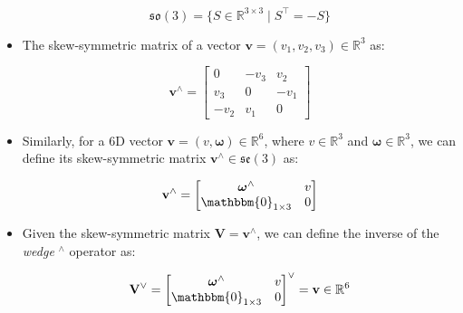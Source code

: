 \begin{itemize}
          \begin{equation}
              \mathfrak{so}(3) = \{S \in \mathbb{R}^{3\times3} \mid S^\top = -S \}
          \end{equation}

    \item The skew-symmetric matrix of a vector $\mathbf{v} = (v_1, v_2, v_3) \in \mathbb{R}^3$ as:

          \begin{equation}
              \mathbf{v} ^\wedge = \begin{bmatrix}
                  0    & -v_3 & v_2  \\
                  v_3  & 0    & -v_1 \\
                  -v_2 & v_1  & 0
              \end{bmatrix}
          \end{equation}

    \item Similarly, for a $6$D vector $\mathbf{v} = (v, \boldsymbol{\omega}) \in \mathbb{R}^6$, where $v \in \mathbb{R}^3$ and $\boldsymbol{\omega} \in \mathbb{R}^3$, we can define its skew-symmetric matrix $\mathbf{v} ^\wedge \in \mathfrak{se}(3)$ as:

          \begin{equation}
              \mathbf{v} ^\wedge = \begin{bmatrix}
                  \boldsymbol{\omega} ^\wedge            & v \\
                  \mathbbm{0} _{1 \times 3} & 0
              \end{bmatrix}
          \end{equation}

    \item Given the skew-symmetric matrix $\mathbf{V} = \mathbf{v}^\wedge$, we can define the inverse of the \textit{wedge} $^\wedge$ operator as:

          \begin{equation}
              \mathbf{V} ^\vee =
              \begin{bmatrix}
                  \boldsymbol{\omega} ^\wedge            & v \\
                  \mathbbm{0} _{1 \times 3} & 0
              \end{bmatrix}^\vee = \mathbf{v} \in \mathbb{R}^6
          \end{equation}

\end{itemize}

